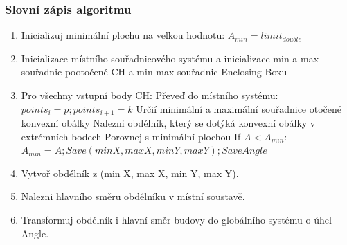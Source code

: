 \documentclass[a4paper,11pt,twoside]{article}
\begin{document}
\subsubsection{Slovní zápis algoritmu}
\begin{enumerate}
\item Inicializuj minimální plochu na velkou hodnotu: $ A_{min} = limit_{double} $
\item Inicializace místního souřadnicového systému a inicializace min a max souřadnic pootočené CH a min max souřadnic Enclosing Boxu 
\item Pro všechny vstupní body CH:
\subitem Převeď do místního systému: $points_i = p; points_{i+1} = k$
\subitem Určií minimální a maximální souřadnice otočené konvexní obálky 
\subitem Nalezni obdélník, který se dotýká konvexní obálky v extrémních bodech
\subitem Porovnej s minimální plochou If $A < A_{min}$: 
\subsubitem $ A_{min} = A; Save (min X, max X, min Y, max Y); Save Angle $
\item Vytvoř obdélník z (min X, max X, min Y, max Y).
\item Nalezni hlavního směru obdélníku v místní soustavě.
\item Transformuj obdélník i hlavní směr budovy do globálního systému o úhel Angle.
\end{enumerate}

\newpage
\vspace*{-1cm}
\end{document}
